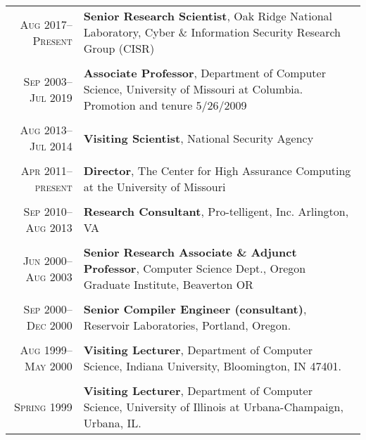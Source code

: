 \documentclass[11pt]{article}
\begin{document}
\begin{tabular}{r|p{11cm}}
 
\textsc{Aug 2017--Present} & {\bf Senior Research Scientist}, Oak Ridge National Laboratory, Cyber \& Information Security Research Group (CISR)
\\
\multicolumn{2}{c}{}
\\[-1ex]

\textsc{Sep 2003--Jul 2019} & {\bf Associate Professor}, Department of Computer
Science,
University of Missouri at Columbia. Promotion and tenure 5/26/2009
\\
\multicolumn{2}{c}{}
\\[-1ex]


\textsc{Aug 2013--Jul 2014} & {\bf Visiting Scientist}, National Security Agency\\
\multicolumn{2}{c}{}
\\[-1ex]

\textsc{Apr 2011--present} & {\bf Director}, The Center for High Assurance Computing at the University of Missouri
\\
\multicolumn{2}{c}{}
\\[-1ex]


\textsc{Sep 2010--Aug 2013} & {\bf Research Consultant}, Pro-telligent, Inc. 
Arlington, VA
\\
\multicolumn{2}{c}{}
\\[-1ex]

\textsc{Jun 2000--Aug 2003} & {\bf Senior Research Associate \& Adjunct Professor}, Computer
Science Dept.,
Oregon Graduate Institute, Beaverton OR
\\
\multicolumn{2}{c}{}
\\[-1ex]

\textsc{Sep 2000--Dec 2000} & {\bf Senior Compiler Engineer (consultant)}, Reservoir
Laboratories, Portland, Oregon.
\\
\multicolumn{2}{c}{}
\\[-1ex]

\textsc{Aug 1999--May 2000} &
    {\bf Visiting Lecturer}, Department of Computer Science,
	Indiana University, Bloomington, IN 47401.
	\\
	\multicolumn{2}{c}{}
	\\[-1ex]
	
\textsc{Spring 1999} & 
	{\bf Visiting Lecturer}, Department of Computer Science,
	  University of Illinois at Urbana-Champaign, Urbana, IL.
\end{tabular}

\end{document}
